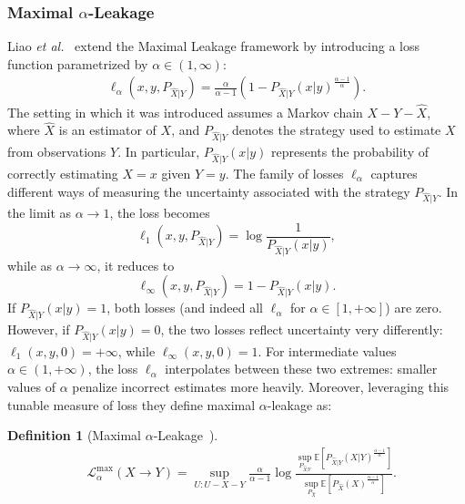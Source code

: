 \documentclass{article}
\numberwithin{theorem}{section}
\numberwithin{example}{section}
\numberwithin{remark}{section}
\newtheorem{definition}{Definition}
\numberwithin{definition}{section}
\newcommand{\E}{\mathbb{E}}
\newcommand{\revised}[1]{{\color{black} #1}}
\begin{document}
\subsubsection{Maximal $\alpha$-Leakage} \label{sec:alpha-leakage}

Liao \emph{et al.}~\cite{LiaoKSC:19} extend the Maximal Leakage framework by introducing a loss function parametrized by $\alpha \in (1,\infty)$:
\begin{align}
    \label{eq:loss-function}
    \ell_\alpha(x,y,P_{\hat{X}|Y}) =\frac{\alpha}{\alpha-1} \left( 1- P_{\hat{X}|Y}(x|y)^{\frac{\alpha-1}{\alpha}} \right).
\end{align}
\revised{The setting in which it was introduced assumes a Markov chain $X - Y - \hat{X}$, where $\hat{X}$ is an estimator of $X$, and $P_{\hat{X}|Y}$ denotes the strategy used to estimate $X$ from observations $Y$. In particular, $P_{\hat{X}|Y}(x|y)$ represents the probability of correctly estimating $X = x$ given $Y = y$. The family of losses $\ell_\alpha$ captures different ways of measuring the uncertainty associated with the strategy $P_{\hat{X}|Y}$.
In the limit as $\alpha \to 1$, the loss becomes
$$
\ell_1(x, y, P_{\hat{X}|Y}) = \log \frac{1}{P_{\hat{X}|Y}(x|y)},$$
while as $\alpha \to \infty$, it reduces to
$$
\ell_\infty(x, y, P_{\hat{X}|Y}) = 1 - P_{\hat{X}|Y}(x|y).$$
If $P_{\hat{X}|Y}(x|y) = 1$, both losses (and indeed all $\ell_\alpha$ for $\alpha \in [1, +\infty]$) are zero. However, if $P_{\hat{X}|Y}(x|y) = 0$, the two losses reflect uncertainty very differently: $\ell_1(x, y, 0) = +\infty$, while $\ell_\infty(x, y, 0) = 1$.
For intermediate values $\alpha \in (1, +\infty)$, the loss $\ell_\alpha$ interpolates between these two extremes: smaller values of $\alpha$ penalize incorrect estimates more heavily. Moreover, leveraging this tunable measure of loss}
 they define maximal $\alpha$-leakage as:
\begin{definition}[Maximal $\alpha$-Leakage~\cite{LiaoKSC:19}] 
    \label{def:max-alpha-leakage}
    \begin{align}
        &\mathcal{L}_\alpha^{\mathrm{max}} (X \!\! \to \!\! Y)= \sup_{U:U-X-Y} \frac{\alpha}{\alpha-1} \log \frac{\sup_{P_{\hat{X}|Y}} \E \left[ P_{\hat{X}|Y}(X|Y)^{\frac{\alpha-1}{\alpha}} \right] } { \sup_{P_{\hat{X}}} \E \left[ P_{\hat{X}}(X)^{\frac{\alpha-1}{\alpha}} \right] }.
        \label{eq:def-max-alpha-leakage}
    \end{align}
\end{definition}
\end{document}
